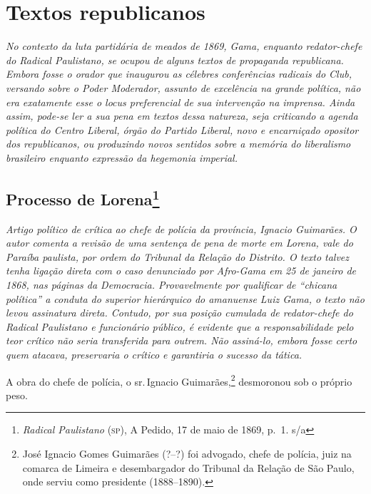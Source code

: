\part{Textos republicanos}

\begin{argumento}\itshape
No contexto da luta partidária de meados de 1869, Gama, enquanto
redator-chefe do \textnormal{Radical Paulistano}, se ocupou de alguns textos
de propaganda republicana. Embora fosse o orador que inaugurou as
célebres conferências radicais do Club, versando sobre o Poder
Moderador, assunto de excelência na grande política, não era exatamente
esse o \textnormal{locus} preferencial de sua intervenção na imprensa. Ainda
assim, pode-se ler a sua pena em textos dessa natureza, seja criticando
a agenda política do Centro Liberal, órgão do Partido Liberal, novo e
encarniçado opositor dos republicanos, ou produzindo novos sentidos
sobre a memória do liberalismo brasileiro enquanto expressão da
hegemonia imperial.
\end{argumento}

\chapter{Processo de Lorena\footnote{\emph{Radical Paulistano} (\textsc{sp}), A
  Pedido, 17 de maio de 1869, p.~1. s/a}}


\begin{didascalia}\itshape
Artigo político de crítica ao chefe de polícia da província, Ignacio
Guimarães. O autor comenta a revisão de uma sentença de pena de morte em
Lorena, vale do Paraíba paulista, por ordem do Tribunal da Relação do
Distrito. O texto talvez tenha ligação direta com o caso denunciado
por Afro-Gama em 25 de janeiro de 1868, nas páginas da \textnormal{Democracia}.
Provavelmente por qualificar de ``chicana política'' a conduta do superior
hierárquico do amanuense Luiz Gama, o texto não levou assinatura direta.
Contudo, por sua posição cumulada de redator-chefe do \textnormal{Radical
Paulistano} e funcionário público, é evidente que a
responsabilidade pelo teor crítico não seria transferida para outrem. Não
assiná-lo, embora fosse certo quem atacava, preservaria o crítico e
garantiria o sucesso da tática.
\end{didascalia}



A obra do chefe de polícia, o sr.\,Ignacio Guimarães,\footnote{José
  Ignacio Gomes Guimarães (?--?) foi advogado, chefe de polícia, juiz na
  comarca de Limeira e desembargador do Tribunal da Relação de São
  Paulo, onde serviu como presidente (1888--1890).} desmoronou sob o
próprio peso.

